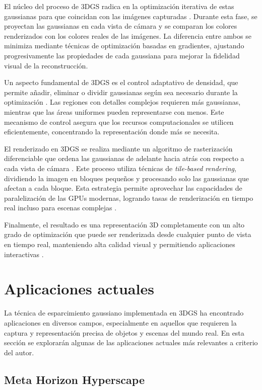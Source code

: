 \documentclass[lettersize,journal]{IEEEtran}
\begin{document}
El núcleo del proceso de 3DGS radica en la optimización iterativa de estas gaussianas para que coincidan con las imágenes capturadas \cite{Kerbl2023}. Durante esta fase, se proyectan las gaussianas en cada vista de cámara y se comparan los colores renderizados con los colores reales de las imágenes. La diferencia entre ambos se minimiza mediante técnicas de optimización basadas en gradientes, ajustando progresivamente las propiedades de cada gaussiana para mejorar la fidelidad visual de la reconstrucción.

Un aspecto fundamental de 3DGS es el control adaptativo de densidad, que permite añadir, eliminar o dividir gaussianas según sea necesario durante la optimización \cite{Kerbl2023}. Las regiones con detalles complejos requieren más gaussianas, mientras que las áreas uniformes pueden representarse con menos. Este mecanismo de control asegura que los recursos computacionales se utilicen eficientemente, concentrando la representación donde más se necesita.

El renderizado en 3DGS se realiza mediante un algoritmo de rasterización diferenciable que ordena las gaussianas de adelante hacia atrás con respecto a cada vista de cámara \cite{Matias2025}. Este proceso utiliza técnicas de \textit{tile-based rendering}, dividiendo la imagen en bloques pequeños y procesando solo las gaussianas que afectan a cada bloque. Esta estrategia permite aprovechar las capacidades de paralelización de las GPUs modernas, logrando tasas de renderización en tiempo real incluso para escenas complejas \cite{Kerbl2023}.

Finalmente, el resultado es una representación 3D completamente con un alto grado de optimización que puede ser renderizada desde cualquier punto de vista en tiempo real, manteniendo alta calidad visual y permitiendo aplicaciones interactivas \cite{Wu2024}.

\section{Aplicaciones actuales}

La técnica de esparcimiento gaussiano implementada en 3DGS ha encontrado aplicaciones en diversos campos, especialmente en aquellos que requieren la captura y representación precisa de objetos y escenas del mundo real. En esta sección se explorarán algunas de las aplicaciones actuales más relevantes a criterio del autor.
\subsection{Meta Horizon Hyperscape}
\end{document}
